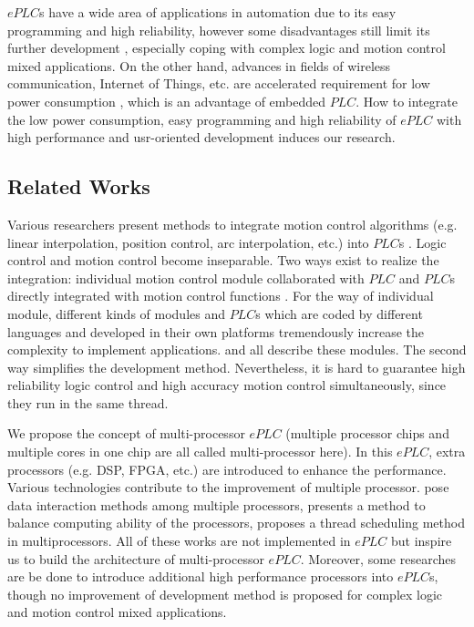 \documentclass[journal,UTF8]{IEEEtran}
\begin{document}
$ePLC$s have a wide area of applications in automation due to its easy programming and high reliability, however some disadvantages still limit its further development \cite{Hossain2014Advanced}, especially coping with complex logic and motion control mixed applications. On the other hand, advances in fields of wireless communication, Internet of Things, etc. are accelerated requirement for low power consumption \cite{Arshad2017Green}, which is an advantage of embedded $PLC$. How to integrate the low power consumption, easy programming and high reliability of $ePLC$ with high performance and usr-oriented development induces our research.

\subsection{Related Works}
Various researchers present methods to integrate motion control algorithms (e.g. linear interpolation, position control, arc interpolation, etc.) into $PLC$s \cite{Ioannides2004Design,Shi2016The,Fang2017Design}. Logic control and motion control become inseparable. Two ways exist to realize the integration: individual motion control module collaborated with $PLC$ \cite{Peng2011Linear} and $PLC$s directly integrated with motion control functions \cite{Ioannides2004Design,syaichu2011model}. For the way of individual module, different kinds of modules and $PLC$s which are coded by different languages and developed in their own platforms tremendously increase the complexity to implement applications. \cite{Peng2011Linear,Qian2014A}  and \cite{Panasonic2011Programmable} all describe these modules. The second way simplifies the development method. Nevertheless, it is hard to guarantee high reliability logic control and high accuracy motion control simultaneously, since they run in the same thread. 

We propose the concept of multi-processor $ePLC$ (multiple processor chips and multiple cores in one chip are all called multi-processor here). In this $ePLC$, extra processors (e.g. DSP, FPGA, etc.) are introduced to enhance the performance. Various technologies contribute to the improvement of multiple processor. \cite{Dubois2002Memory,Patel2006Processor} pose data interaction methods among multiple processors, \cite{Zhu2016Providing} presents a method to balance computing ability of the processors, \cite{Albarakat2017MTB} proposes a thread scheduling method in multiprocessors. All of these works are not implemented in $ePLC$ but inspire us to build the architecture of multi-processor $ePLC$. Moreover, some researches \cite{Hajduk2015Architecture, Chmiel2016An} are be done to introduce additional high performance processors into $ePLC$s, though no improvement of development method is proposed for complex logic and motion control mixed applications.
\end{document}
